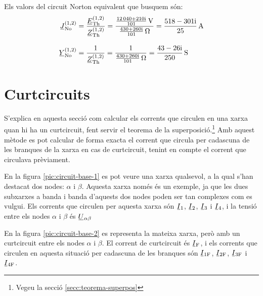 \begin{exemple}
    Els valors del circuit Norton equivalent que busquem són:
    \begin{align*}
       \cmplx{J}\ped{No}^{(1,2)} &= \frac{\cmplx{E}\ped{Th}^{(1,2)}}{\cmplx{Z}\ped{Th}^{(1,2)}} =
       \frac{\frac{\complexnum{12040+j210}}{101}\,\unit{V}}{\frac{\complexnum{430+j260}}{101}\,\unit{\ohm}} =
       \frac{\complexnum{518-j301}}{25}\,\unit{A} \\[2ex]
       \cmplx{Y}\ped{No}^{(1,2)} &= \frac{1}{\cmplx{Z}\ped{Th}^{(1,2)}} =
       \frac{1}{\frac{\complexnum{430+j260}}{101}\,\unit{\ohm}} = \frac{\complexnum{43-j26}}{250}\,\unit{S}
    \end{align*}

\end{exemple}


\section{Curtcircuits}\label{sec:xarxes-curtcircuits}

S'explica en aquesta secció  com calcular els corrents que circulen en una xarxa quan hi ha un curtcircuit, fent servir el teorema de la superposició.\footnote{Vegeu la secció \ref{secc:teorema-superpos}} Amb aquest mètode es pot calcular de forma exacta el corrent que circula per cadascuna de les branques de la xarxa en cas de curtcircuit, tenint en compte el corrent que circulava prèviament.

En la figura \vref{pic:circuit-base-1} es pot veure una xarxa qualsevol, a la qual s'han destacat dos nodes: $\alpha$ i $\beta$. Aquesta xarxa només és un exemple, ja que les dues subxarxes a banda i banda d'aquests dos nodes poden ser tan complexes com es vulgui. Els corrents que circulen per aquesta xarxa són $\cmplx{I}_1$, $\cmplx{I}_2$, $\cmplx{I}_3$ i $\cmplx{I}_4$, i la tensió entre els nodes $\alpha$ i $\beta$ és $\cmplx{U}_{\alpha\beta}$

\begin{center}
	
	\label{pic:circuit-base-1}
\end{center}

En la figura \vref{pic:circuit-base-2} es representa la mateixa xarxa, però amb un curtcircuit entre  els nodes $\alpha$ i $\beta$. El corrent de curtcircuit és $\cmplx{I}\ped{F}$, i els corrents que circulen en aquesta situació per cadascuna de les branques són $\cmplx{I}\ped{1F}$, $\cmplx{I}\ped{2F}$, $\cmplx{I}\ped{3F}$ i $\cmplx{I}\ped{4F}$.

